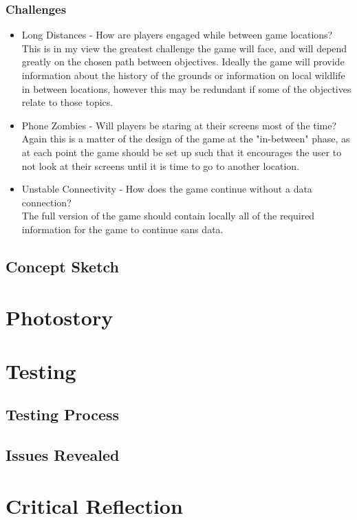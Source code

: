 \documentclass[12pt, a4paper]{article}
\begin{document}
\subsubsection{Challenges}
\begin{itemize}
  \item Long Distances - How are players engaged while between game locations?\\
        This is in my view the greatest challenge the game will face, and will depend greatly on the chosen path between objectives.
        Ideally the game will provide information about the history of the grounds or information on local wildlife in between locations, however this may be redundant if some of the objectives relate to those topics.
  \item Phone Zombies - Will players be staring at their screens most of the time?\\
        Again this is a matter of the design of the game at the "in-between" phase, as at each point the game should be set up such that it encourages the user to not look at their screens until it is time to go to another location.
  \item Unstable Connectivity - How does the game continue without a data connection?\\
        The full version of the game should contain locally all of the required information for the game to continue sans data.
\end{itemize}

\subsection{Concept Sketch}


\section{Photostory}

\section{Testing}
\subsection{Testing Process}
\subsection{Issues Revealed}

\section{Critical Reflection}
\end{document}
